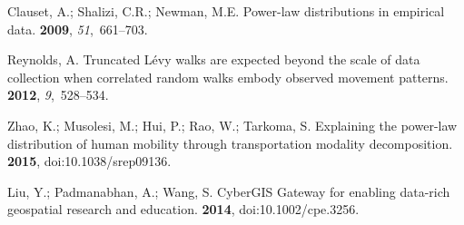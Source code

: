 \documentclass[ijgi,article,accept,moreauthors,pdftex,10pt,a4paper]{mdpi}
\theoremstyle{mdpi}
\newcounter{ex}
\newcounter{re}
\theoremstyle{mdpidefinition}
\begin{document}
\begin{thebibliography}{-------}
Clauset, A.; Shalizi, C.R.; Newman, M.E.
\newblock Power-law distributions in empirical data.
 {\bf 2009}, {\em 51},~661--703.

Reynolds, A.
\newblock Truncated L{\'e}vy walks are expected beyond the scale of data
  collection when correlated random walks embody observed movement patterns.
 {\bf 2012}, {\em
  9},~528--534.

Zhao, K.; Musolesi, M.; Hui, P.; Rao, W.; Tarkoma, S.
\newblock Explaining the power-law distribution of human mobility through
  transportation modality decomposition.
 {\bf 2015}, doi:10.1038/srep09136.

Liu, Y.; Padmanabhan, A.; Wang, S.
\newblock CyberGIS Gateway for enabling data-rich geospatial research and
  education.
 {\bf
  2014}, doi:10.1002/cpe.3256.

\end{thebibliography}
\end{document}
